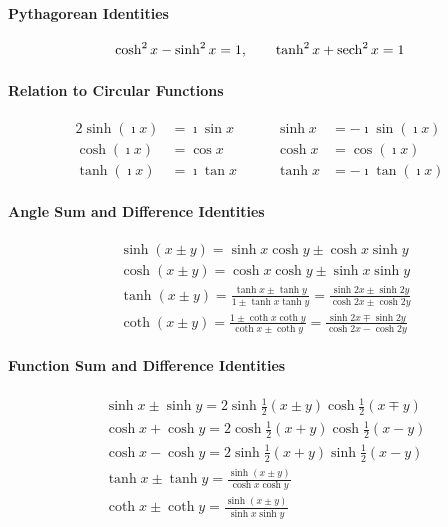 \paragraph{Pythagorean Identities}
\[ \cosh^2 x - \sinh^2 x = 1, \qquad \tanh^2 x + \mathop{\mathrm{sech}}\nolimits^2 x = 1 \]

\paragraph{Relation to Circular Functions}
\begin{alignat*}{2}
  \sinh(\imath x) &= \imath \sin x &\qquad \sinh x &= -\imath \sin(\imath x)
  \\
  \cosh(\imath x) &= \cos x &\qquad \cosh x &= \cos(\imath x)
  \\
  \tanh(\imath x) &= \imath \tan x &\qquad \tanh x &= - \imath \tan(\imath x)
\end{alignat*}

\paragraph{Angle Sum and Difference Identities}
\begin{align*}
  &\sinh(x \pm y) = \sinh x \cosh y \pm \cosh x \sinh y \\
  &\cosh(x \pm y) = \cosh x \cosh y \pm \sinh x \sinh y \\
  &\tanh(x \pm y) = \frac{\tanh x \pm \tanh y}{1 \pm \tanh x \tanh y}
  = \frac{\sinh 2x \pm \sinh 2y}{\cosh 2x \pm \cosh 2y} \\
  &\coth(x \pm y) = \frac{1 \pm \coth x \coth y}{\coth x \pm \coth y}
  = \frac{\sinh 2x \mp \sinh 2y}{\cosh 2x - \cosh 2y}
\end{align*}

\paragraph{Function Sum and Difference Identities}
\begin{align*}
  &\sinh x \pm \sinh y = 2 \sinh \frac{1}{2}(x \pm y) 
  \cosh \frac{1}{2}(x \mp y) \\
  &\cosh x + \cosh y = 2 \cosh \frac{1}{2}(x+y) \cosh \frac{1}{2}(x-y) \\
  &\cosh x - \cosh y = 2 \sinh \frac{1}{2}(x+y) \sinh \frac{1}{2}(x-y) \\
  &\tanh x \pm \tanh y = \frac{\sinh(x \pm y)}{\cosh x \cosh y} \\
  &\coth x \pm \coth y = \frac{\sinh(x \pm y)}{\sinh x \sinh y} \\
\end{align*}


